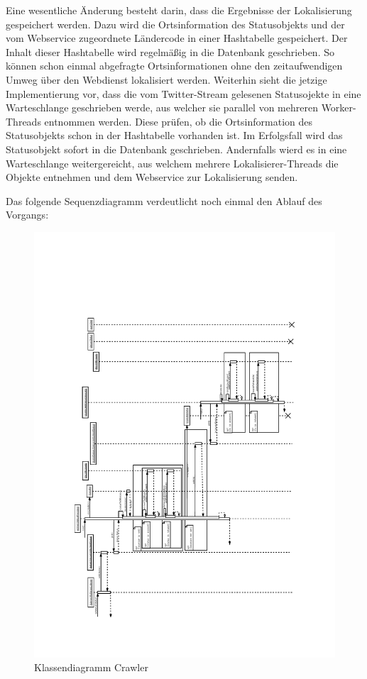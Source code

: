 Eine wesentliche Änderung besteht darin, dass die Ergebnisse der Lokalisierung gespeichert werden. Dazu wird die Ortsinformation des Statusobjekts und der vom Webservice zugeordnete Ländercode in einer Hashtabelle gespeichert. Der Inhalt dieser Hashtabelle wird regelmäßig in die Datenbank geschrieben. So können schon einmal abgefragte Ortsinformationen ohne den zeitaufwendigen Umweg über den Webdienst lokalisiert werden. 
Weiterhin sieht die jetzige Implementierung vor, dass die vom Twitter-Stream gelesenen Statusojekte in eine Warteschlange geschrieben werde, aus welcher sie parallel von mehreren Worker-Threads entnommen werden. Diese prüfen, ob die Ortsinformation des Statusobjekts schon in der Hashtabelle vorhanden ist. Im Erfolgsfall wird das Statusobjekt sofort in die Datenbank geschrieben. Andernfalls wierd es in eine  Warteschlange weitergereicht, aus welchem mehrere Lokalisierer-Threads die Objekte entnehmen und dem Webservice zur Lokalisierung senden.

Das folgende Sequenzdiagramm verdeutlicht noch einmal den Ablauf des Vorgangs:
\begin{figure}[H] %
	\centering
	\includegraphics[width=\textwidth,height=\textheight,keepaspectratio=true]{dia/crawler_process_sequence}
	\caption{Klassendiagramm Crawler}
	\label{fig:Crawler}
\end{figure}

